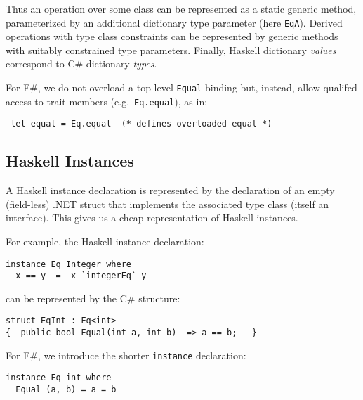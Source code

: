 \documentclass{elsarticle}
\newif\ifclassic
\begin{document}
Thus an operation over some class can be represented as a static generic method, 
parameterized by an additional dictionary type parameter (here \lstinline{EqA}).
Derived operations with type class constraints can be represented by generic methods with suitably constrained type parameters.
Finally, Haskell dictionary \emph{values} correspond to  C\# dictionary \emph{types}.

For F\#, we do not overload a top-level \lstinline{Equal} binding but, instead, allow qualifed access to trait members (e.g.\ \lstinline{Eq.equal}), as in:
\begin{lstlisting}
 let equal = Eq.equal  (* defines overloaded equal *)
\end{lstlisting}




\subsection{Haskell Instances}
A Haskell instance declaration is represented by the declaration of an empty (field-less) .NET  struct that implements the associated type class (itself an interface).
This gives us a cheap representation of Haskell instances. 

For example, the Haskell instance declaration:


{\small
\begin{lstlisting}
instance Eq Integer where 
  x == y  =  x `integerEq` y
\end{lstlisting}
}
can be represented by the C\# structure:
\begin{lstlisting}
struct EqInt : Eq<int>  
{  public bool Equal(int a, int b)  => a == b;   }
\end{lstlisting}

\ifclassic
For F\#, we introduce the shorter \lstinline{instance} declaration:

\begin{lstlisting}
instance Eq int where 
  Equal (a, b) = a = b
\end{lstlisting}
\end{document}
